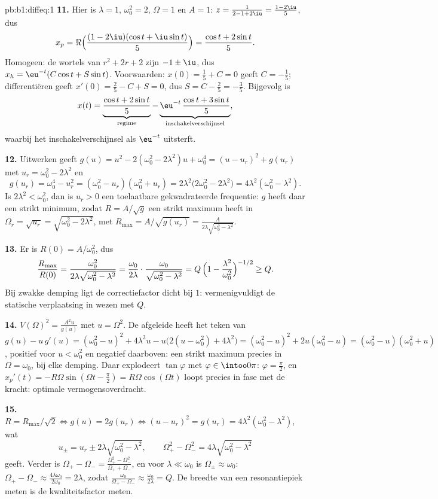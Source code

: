 \begin{solution}{pb:b1:diffeq:1}
\textbf{11.} Hier is $\lambda = 1$, $\omega_0^2 = 2$, $\Omega = 1$ en $A
= 1$: $z = \frac1{2 - 1 + 2\iu} = \frac{1 - 2\iu}5$, dus
\[
x_p = \Re\Bigl(\frac{(1 - 2\iu)(\cos t + \iu\sin t)}5\Bigr)
= \frac{\cos t + 2\sin t}5 .
\]
Homogeen: de wortels van $r^2 + 2r + 2$ zijn $-1 \pm \iu$, dus $x_h =
\eu^{-t}(C\cos t + S\sin t)$. Voorwaarden: $x(0) = \frac15 + C = 0$ geeft
$C = -\frac15$; differentiëren geeft $x'(0) = \frac25 - C + S = 0$, dus $S
= C - \frac25 = -\frac35$. Bijgevolg is
\[
x(t) = \underbrace{\frac{\cos t + 2\sin t}5}_{\text{regime}}
- \underbrace{\eu^{-t}\,\frac{\cos t + 3\sin
t}5}_{\text{inschakelverschijnsel}} ,
\]
waarbij het inschakelverschijnsel als $\eu^{-t}$ uitsterft.

\textbf{12.} Uitwerken geeft $g(u) = u^2 - 2(\omega_0^2 - 2\lambda^2)u +
\omega_0^4 = (u - u_r)^2 + g(u_r)$ met $u_r = \omega_0^2 - 2\lambda^2$ en
\[
g(u_r) = \omega_0^4 - u_r^2 = (\omega_0^2 - u_r)(\omega_0^2 +
u_r) = 2\lambda^2\bigl(2\omega_0^2 - 2\lambda^2\bigr) =
4\lambda^2(\omega_0^2 - \lambda^2) .
\]
Is $2\lambda^2 < \omega_0^2$, dan is $u_r > 0$ een toelaatbare
gekwadrateerde frequentie: $g$ heeft daar een strikt minimum, zodat $R =
A/\sqrt g$ een strikt maximum heeft in $\Omega_r = \sqrt{u_r} =
\sqrt{\omega_0^2 - 2\lambda^2}$, met $R_{\max} = A/\sqrt{g(u_r)} =
\frac{A}{2\lambda\sqrt{\omega_0^2 - \lambda^2}}$.

\textbf{13.} Er is $R(0) = A/\omega_0^2$, dus
\[
\frac{R_{\max}}{R(0)}
= \frac{\omega_0^2}{2\lambda\sqrt{\omega_0^2 - \lambda^2}}
= \frac{\omega_0}{2\lambda}\cdot
\frac{\omega_0}{\sqrt{\omega_0^2 - \lambda^2}}
= Q\,\Bigl(1 - \frac{\lambda^2}{\omega_0^2}\Bigr)^{-1/2}
\geq Q .
\]
Bij zwakke demping ligt de correctiefactor dicht bij $1$: 
vermenigvuldigt de statische verplaatsing in wezen met $Q$.

\textbf{14.} $V(\Omega)^2 = \frac{A^2 u}{g(u)}$ met $u = \Omega^2$. De
afgeleide heeft het teken van $g(u) - u\,g'(u) = (\omega_0^2 - u)^2 +
4\lambda^2 u - u\bigl(2(u - \omega_0^2) + 4\lambda^2\bigr) = (\omega_0^2
- u)^2 + 2u(\omega_0^2 - u) = (\omega_0^2 - u)(\omega_0^2 + u)$, positief
voor $u < \omega_0^2$ en negatief daarboven: een strikt maximum precies in
$\Omega = \omega_0$, bij elke demping. Daar explodeert $\tan\varphi$ met
$\varphi \in \intoo0\pi$: $\varphi = \frac\pi2$, en $x_p'(t) =
-R\Omega\sin(\Omega t - \frac\pi2) = R\Omega\cos(\Omega t)$ loopt precies
in fase met de kracht: optimale vermogensoverdracht.

\textbf{15.} $R = R_{\max}/\sqrt2 \iff g(u) = 2g(u_r) \iff (u - u_r)^2 =
g(u_r) = 4\lambda^2(\omega_0^2 - \lambda^2)$, wat
\[
u_\pm = u_r \pm 2\lambda\sqrt{\omega_0^2 - \lambda^2},
\qquad
\Omega_+^2 - \Omega_-^2 = 4\lambda\sqrt{\omega_0^2 - \lambda^2}
\]
geeft. Verder is $\Omega_+ - \Omega_- = \frac{\Omega_+^2 -
\Omega_-^2}{\Omega_+ + \Omega_-}$, en voor $\lambda \ll \omega_0$ is
$\Omega_\pm \approx \omega_0$: $\Omega_+ - \Omega_- \approx
\frac{4\lambda\omega_0}{2\omega_0} = 2\lambda$, zodat
$\frac{\omega_0}{\Omega_+ - \Omega_-} \approx \frac{\omega_0}{2\lambda} =
Q$. De breedte van een resonantiepiek meten is de kwaliteitsfactor meten.


\end{solution}
